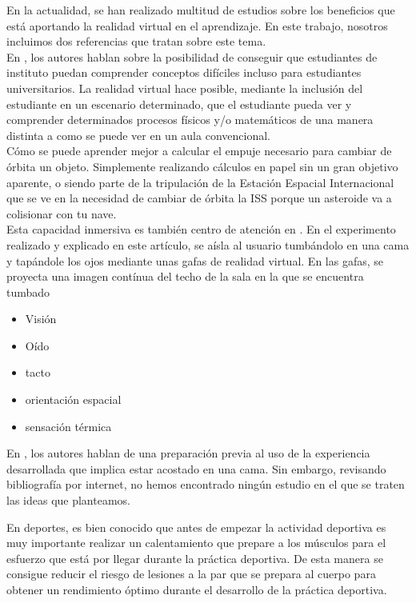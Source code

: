 \documentclass[twoside,twocolumn]{article}
\begin{document}
En la actualidad, se han realizado multitud de estudios sobre los beneficios que est\'a aportando la realidad virtual en el aprendizaje. En este trabajo, nosotros incluimos dos referencias que tratan sobre este tema.\\

En \cite{ScienceSpace}, los autores hablan sobre la posibilidad de conseguir que estudiantes de instituto puedan comprender conceptos dif\'iciles incluso para estudiantes universitarios. La realidad virtual hace posible, mediante la inclusi\'on del estudiante en un escenario determinado, que el estudiante pueda ver y comprender determinados procesos f\'isicos y/o matem\'aticos de una manera distinta a como se puede ver en un aula convencional.\\

C\'omo se puede aprender mejor a calcular el empuje necesario para cambiar de \'orbita un objeto. Simplemente realizando c\'alculos en papel sin un gran objetivo aparente, o siendo parte de la tripulaci\'on de la Estaci\'on Espacial Internacional que se ve en la necesidad de cambiar de \'orbita la ISS porque un asteroide va a colisionar con tu nave.\\

Esta capacidad inmersiva es tambi\'en centro de atenci\'on en \cite{Presence}. En el experimento realizado y explicado en este art\'iculo, se a\'isla al usuario tumb\'andolo en una cama y tap\'andole los ojos mediante unas gafas de realidad virtual. En las gafas, se proyecta una imagen cont\'inua del techo de la sala en la que se encuentra tumbado

\begin{itemize}
\item Visi\'on
\item O\'ido
\item tacto
\item orientaci\'on espacial
\item sensaci\'on t\'ermica
\end{itemize}

En \cite{Presence}, los autores hablan de una preparaci\'on previa al uso de la experiencia desarrollada que implica estar acostado en una cama. Sin embargo, revisando bibliograf\'ia por internet, no hemos encontrado ning\'un estudio en el que se traten las ideas que planteamos.

En deportes, es bien conocido que antes de empezar la actividad deportiva es muy importante realizar un calentamiento que prepare a los m\'usculos para el esfuerzo que est\'a por llegar durante la pr\'actica deportiva. De esta manera se consigue reducir el riesgo de lesiones a la par que se prepara al cuerpo para obtener un rendimiento \'optimo durante el desarrollo de la pr\'actica deportiva.\\
\end{document}
